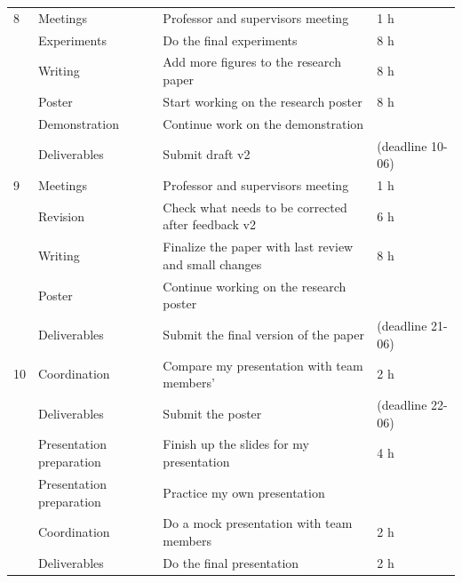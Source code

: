 \documentclass[english, a4paper]{article}
\begin{document}
\begin{longtable}{p{1.0cm} p{3.1cm} p{7.0cm} p{3.0cm}}
8 & Meetings & Professor and supervisors meeting & 1 h \\
    & Experiments & Do the final experiments & 8 h \\
    & Writing & Add more figures to the research paper & 8 h \\
    & Poster & Start working on the research poster & 8 h \\
    & Demonstration & Continue work on the demonstration & \\
    & Deliverables & Submit draft v2 & (deadline 10-06) \\
\hline

9 & Meetings & Professor and supervisors meeting & 1 h \\
    & Revision & Check what needs to be corrected after feedback v2 & 6 h \\
    & Writing & Finalize the paper with last review and small changes & 8 h \\
    & Poster & Continue working on the research poster & \\
    & Deliverables & Submit the final version of the paper & (deadline 21-06) \\
\hline

10 & Coordination & Compare my presentation with team members' & 2 h \\
     & Deliverables & Submit the poster & (deadline 22-06)\\
    & Presentation preparation & Finish up the slides for my presentation & 4 h \\
    & Presentation preparation & Practice my own presentation & \\
     & Coordination & Do a mock presentation with team members & 2 h \\
     & Deliverables & Do the final presentation & 2 h \\
\hline
\end{longtable}

\printbibliography 
\end{document}
